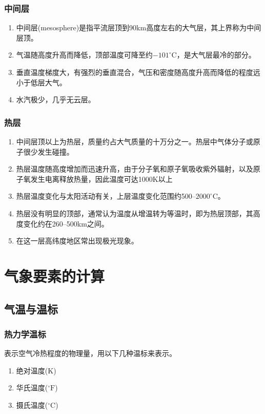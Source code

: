 \documentclass[UTF8,a4paper,11pt,oneside]{ctexbook}
\begin{document}
\subsection{中间层}
\begin{enumerate}
    \item 中间层(mesosphere)是指平流层顶到90km高度左右的大气层，其上界称为中间层顶。
    \item 气温随高度升高而降低，顶部温度可降至约\(-101^\circ\mathrm{C}\)，是大气层最冷的部分。
    \item 垂直温度梯度大，有强烈的垂直混合，气压和密度随高度升高而降低的程度远小于低层大气。
    \item 水汽极少，几乎无云层。
\end{enumerate}

\subsection{热层}
\begin{enumerate}
    \item 中间层顶以上为热层，质量约占大气质量的十万分之一。热层中气体分子或原子很少发生碰撞。
    \item 热层温度随高度增加而迅速升高，由于分子氧和原子氧吸收紫外辐射，以及原子氧发生电离释放热量，因此温度可达1000K以上
    \item 热层温度变化与太阳活动有关，上层温度变化范围约500--\(2000^\circ\mathrm{C}\)。
    \item 热层没有明显的顶部，通常认为温度从增温转为等温时，即为热层顶部，其高度变化约在260--500km之间。
    \item 在这一层高纬度地区常出现极光现象。
\end{enumerate}

\chapter{气象要素的计算}

\section{气温与温标}

\subsection{热力学温标}

表示空气冷热程度的物理量，用以下几种温标来表示。
\begin{enumerate}
    \item 绝对温度(\(\mathrm{K}\))
    \item 华氏温度(\(^\circ\mathrm{F}\))
    \item 摄氏温度(\(^\circ\mathrm{C}\))
\end{enumerate}
\end{document}
